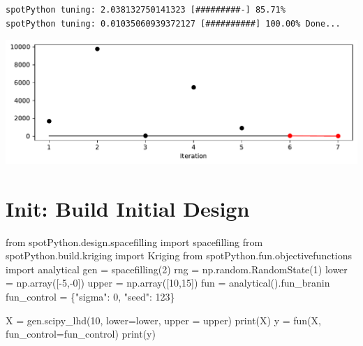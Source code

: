 \documentclass[
  letterpaper,
  DIV=11,
  numbers=noendperiod]{scrreprt}
\newenvironment{Shaded}{\begin{snugshade}}{\end{snugshade}}
\newcommand{\BuiltInTok}[1]{\textcolor[rgb]{0.00,0.23,0.31}{#1}}
\newcommand{\DecValTok}[1]{\textcolor[rgb]{0.68,0.00,0.00}{#1}}
\newcommand{\ImportTok}[1]{\textcolor[rgb]{0.00,0.46,0.62}{#1}}
\newcommand{\NormalTok}[1]{\textcolor[rgb]{0.00,0.23,0.31}{#1}}
\newcommand{\OperatorTok}[1]{\textcolor[rgb]{0.37,0.37,0.37}{#1}}
\newcommand{\StringTok}[1]{\textcolor[rgb]{0.13,0.47,0.30}{#1}}
\begin{document}
\begin{verbatim}
spotPython tuning: 2.038132750141323 [#########-] 85.71% 
spotPython tuning: 0.01035060939372127 [##########] 100.00% Done...
\end{verbatim}

\includegraphics{a_04_spot_doc_files/figure-pdf/cell-13-output-2.pdf}

\section{Init: Build Initial Design}\label{init-build-initial-design-1}

\begin{Shaded}
\begin{Highlighting}[]
\ImportTok{from}\NormalTok{ spotPython.design.spacefilling }\ImportTok{import}\NormalTok{ spacefilling}
\ImportTok{from}\NormalTok{ spotPython.build.kriging }\ImportTok{import}\NormalTok{ Kriging}
\ImportTok{from}\NormalTok{ spotPython.fun.objectivefunctions }\ImportTok{import}\NormalTok{ analytical}
\NormalTok{gen }\OperatorTok{=}\NormalTok{ spacefilling(}\DecValTok{2}\NormalTok{)}
\NormalTok{rng }\OperatorTok{=}\NormalTok{ np.random.RandomState(}\DecValTok{1}\NormalTok{)}
\NormalTok{lower }\OperatorTok{=}\NormalTok{ np.array([}\OperatorTok{{-}}\DecValTok{5}\NormalTok{,}\OperatorTok{{-}}\DecValTok{0}\NormalTok{])}
\NormalTok{upper }\OperatorTok{=}\NormalTok{ np.array([}\DecValTok{10}\NormalTok{,}\DecValTok{15}\NormalTok{])}
\NormalTok{fun }\OperatorTok{=}\NormalTok{ analytical().fun\_branin}
\NormalTok{fun\_control }\OperatorTok{=}\NormalTok{ \{}\StringTok{"sigma"}\NormalTok{: }\DecValTok{0}\NormalTok{,}
               \StringTok{"seed"}\NormalTok{: }\DecValTok{123}\NormalTok{\}}

\NormalTok{X }\OperatorTok{=}\NormalTok{ gen.scipy\_lhd(}\DecValTok{10}\NormalTok{, lower}\OperatorTok{=}\NormalTok{lower, upper }\OperatorTok{=}\NormalTok{ upper)}
\BuiltInTok{print}\NormalTok{(X)}
\NormalTok{y }\OperatorTok{=}\NormalTok{ fun(X, fun\_control}\OperatorTok{=}\NormalTok{fun\_control)}
\BuiltInTok{print}\NormalTok{(y)}
\end{Highlighting}
\end{Shaded}
\end{document}
